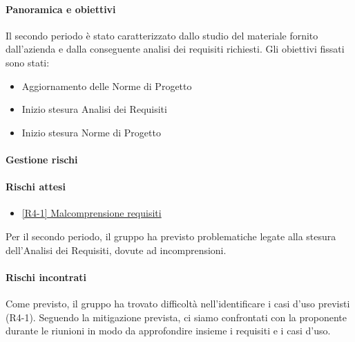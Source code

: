 \documentclass[a4paper,12pt]{article}
\begin{document}
            \paragraph{Panoramica e obiettivi}
            Il secondo periodo è stato caratterizzato dallo studio del materiale fornito dall'azienda e dalla conseguente analisi dei requisiti richiesti. Gli obiettivi fissati sono stati:
                \begin{itemize}
                    \item Aggiornamento delle Norme di Progetto
                    \item Inizio stesura Analisi dei Requisiti
                    \item Inizio stesura Norme di Progetto
                \end{itemize}

            \paragraph{Gestione rischi}
            \paragraph*{Rischi attesi}
                \begin{itemize}
                    \item\hyperref[tab:r4]{[R4-1] Malcomprensione requisiti}
                \end{itemize}
                Per il secondo periodo, il gruppo ha previsto problematiche legate alla stesura dell'Analisi dei Requisiti, dovute ad incomprensioni.

            \paragraph*{Rischi incontrati}
                Come previsto, il gruppo ha trovato difficoltà nell'identificare i casi d'uso previsti (R4-1). Seguendo la mitigazione prevista, ci siamo confrontati con la proponente durante le riunioni in modo da approfondire insieme i requisiti e i casi d'uso.
            
\end{document}
